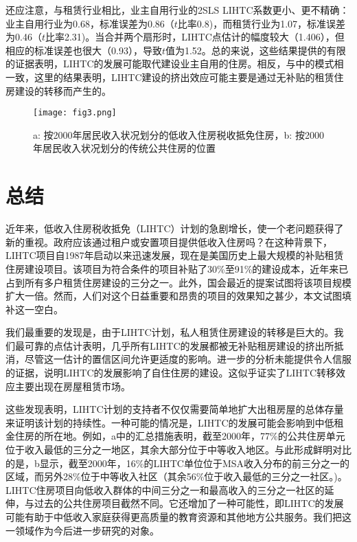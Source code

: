 \documentclass[lang=cn,11pt,a4paper]{paper}
\begin{document}
还应注意，与租赁行业相比，业主自用行业的2SLS LIHTC系数更小、更不精确：业主自用行业为0.68，标准误差为0.86（$t$比率0.8)，而租赁行业为1.07，标准误差为0.46（$t$比率2.31)。当合并两个扇形时，LIHTC点估计的幅度较大（1.406），但相应的标准误差也很大（0.93），导致$t$值为1.52。总的来说，这些结果提供的有限的证据表明，LIHTC的发展可能取代建设业主自用的住房。相反，与中的模式相一致，这里的结果表明，LIHTC建设的挤出效应可能主要是通过无补贴的租赁住房建设的转移而产生的。

\begin{figure}[t]
	\centering
	\texttt{[image: fig3.png]}
  \caption{a: 按2000年居民收入状况划分的低收入住房税收抵免住房，b: 按2000年居民收入状况划分的传统公共住房的位置}\label{fig3}
\end{figure}

\section{总结}\label{sec6}

近年来，低收入住房税收抵免（LIHTC）计划的急剧增长，使一个老问题获得了新的重视。政府应该通过租户或安置项目提供低收入住房吗？在这种背景下，LIHTC项目自1987年启动以来迅速发展，现在是美国历史上最大规模的补贴租赁住房建设项目。该项目为符合条件的项目补贴了30\%至91\%的建设成本，近年来已占到所有多户租赁住房建设的三分之一。此外，国会最近的提案试图将该项目规模扩大一倍。然而，人们对这个日益重要和昂贵的项目的效果知之甚少，本文试图填补这一空白。

我们最重要的发现是，由于LIHTC计划，私人租赁住房建设的转移是巨大的。我们最可靠的点估计表明，几乎所有LIHTC的发展都被无补贴租房建设的挤出所抵消，尽管这一估计的置信区间允许更适度的影响。进一步的分析未能提供令人信服的证据，说明LIHTC的发展影响了自住住房的建设。这似乎证实了LIHTC转移效应主要出现在房屋租赁市场。

这些发现表明，LIHTC计划的支持者不仅仅需要简单地扩大出租房屋的总体存量来证明该计划的持续性。一种可能的情况是，LIHTC的发展可能会影响到中低租金住房的所在地。例如，a中的汇总措施表明，截至2000年，77\%的公共住房单元位于收入最低的三分之一地区，其余大部分位于中等收入地区。与此形成鲜明对比的是，b显示，截至2000年，16\%的LIHTC单位位于MSA收入分布的前三分之一的区域，而另外28\%位于中等收入社区（其余56\%位于收入最低的三分之一社区。)。LIHTC住房项目向低收入群体的中间三分之一和最高收入的三分之一社区的延伸，与过去的公共住房项目截然不同。它还增加了一种可能性，即LIHTC的发展可能有助于中低收入家庭获得更高质量的教育资源和其他地方公共服务。我们把这一领域作为今后进一步研究的对象。
\end{document}
